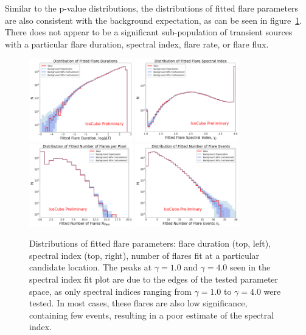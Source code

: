 Similar to the p-value distributions, the distributions of fitted flare parameters are also consistent with the background expectation, as can be seen in figure~\ref{fig:fitparamdists}. There does not appear to be a significant sub-population of transient sources with a particular flare duration, spectral index, flare rate, or flare flux. 

\begin{figure}[h]
\centering
\includegraphics[width=0.4\textwidth]{figs/fitted_flare_durations.png}
\includegraphics[width=0.4\textwidth]{figs/fitted_flare_gamma.png}
\includegraphics[width=0.4\textwidth]{figs/fitted_flare_Nflare.png}
\includegraphics[width=0.4\textwidth]{figs/fitted_flare_ns.png}
\caption{Distributions of fitted flare parameters: flare duration (top, left), spectral index (top, right), number of flares fit at a particular candidate location. The peaks at $\gamma=1.0$ and $\gamma=4.0$ seen in the spectral index fit plot are due to the edges of the tested parameter space, as only spectral indices ranging from $\gamma=1.0$ to $\gamma=4.0$ were tested. In most cases, these flares are also low significance, containing few events, resulting in a poor estimate of the spectral index.}
\label{fig:fitparamdists}
\end{figure}

